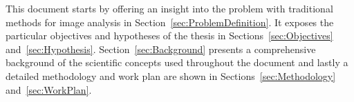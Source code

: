 This document starts by offering an insight into the problem with traditional methods for image analysis in Section~\ref{sec:ProblemDefinition}. It exposes the particular objectives and hypotheses of the thesis in Sections~\ref{sec:Objectives} and~\ref{sec:Hypothesis}. Section~\ref{sec:Background} presents a comprehensive background of the scientific concepts used throughout the document and lastly a detailed methodology and work plan are shown in Sections~\ref{sec:Methodology} and~\ref{sec:WorkPlan}.

\begin{comment}
En esta sección se espera que el autor describa en forma más amplia a como
se presentó en el {\it Resumen}, algunos aspectos como el contexto de la
investigación, el problema a resolver, la forma propuesta de resolver, algunos
antecedentes, entre otros.

Los puntos importantes en la {\it Introducción} son:
\begin{itemize}
	\item Introducción al contexto donde se va a realizar la propuesta
	\item Determinar la situación problemática 
	\item Definir el problema y los factores y aspectos más importantes que intervienen  en el problema
	\item Justificar por qué es importante resolver ese problema
 Michael: Hasta aqui es pareciod a lo de definicion de problema. M
	\item Explicar lo qué se ha hecho para resolver ese problema
	\item Describir el modelo de solución del problema
	\item Establecer los posibles logros en la solución del problema
	\item Describir la organización del documento
\end{itemize}

{\bf Ejemplo de Cita Bibliográfica:}

En años recientes se ha manifestado interés en el área de Algoritmos Genéticos
con la Teoría de Dificultad
Walsh polynomials \cite{Clear2}....... \\


{\bf No olviden incluir en donde corresponde
 la motivación, la justificación, el alcance de la
investigación, los recursos y las suposiciones...}
\end{comment}
